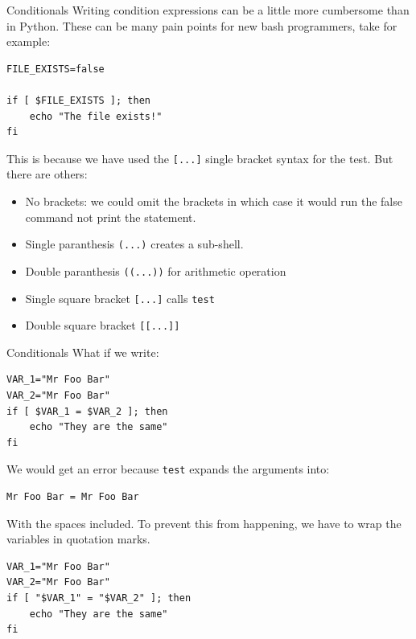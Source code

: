 \documentclass[10pt]{beamer}
\begin{document}
\begin{frame}[label={sec:orgb734b4d},fragile]{Conditionals}
 Writing condition expressions can be a little more cumbersome than in
Python. These can be many pain points for new bash programmers, take for
example:

\begin{verbatim}
FILE_EXISTS=false

if [ $FILE_EXISTS ]; then
    echo "The file exists!"
fi
\end{verbatim}

This is because we have used the \texttt{[...]} single bracket syntax for the test. But
there are others:

\begin{itemize}
\item No brackets: we could omit the brackets in which case it would run the false
command not print the statement.
\item Single paranthesis \texttt{(...)} creates a sub-shell.
\item Double paranthesis \texttt{((...))} for arithmetic operation
\item Single square bracket \texttt{[...]} calls \texttt{test}
\item Double square bracket \texttt{[[...]]}
\end{itemize}
\end{frame}

\begin{frame}[label={sec:org8f74e62},fragile]{Conditionals}
 What if we write:

\begin{verbatim}
VAR_1="Mr Foo Bar"
VAR_2="Mr Foo Bar"
if [ $VAR_1 = $VAR_2 ]; then
    echo "They are the same"
fi
\end{verbatim}

We would get an error because \texttt{test} expands the arguments into:

\begin{verbatim}
Mr Foo Bar = Mr Foo Bar
\end{verbatim}

With the spaces included. To prevent this from happening, we have to wrap the
variables in quotation marks.

\begin{verbatim}
VAR_1="Mr Foo Bar"
VAR_2="Mr Foo Bar"
if [ "$VAR_1" = "$VAR_2" ]; then
    echo "They are the same"
fi
\end{verbatim}
\end{frame}
\end{document}
